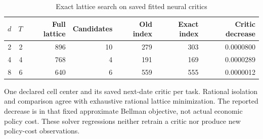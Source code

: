 \begin{table}[htbp]
\centering
\caption{Exact lattice search on saved fitted neural critics}\label{tab:algebraic56}
{\small\setlength{\tabcolsep}{4pt}
\begin{tabular}{rrrrrrr}
\toprule
$d$ & $T$ & Full lattice & Candidates & Old index & Exact index & Critic decrease \\
\midrule
2 & 2 & 896 & 10 & 279 & 303 & 0.0000800 \\
4 & 4 & 768 & 4 & 191 & 169 & 0.0000289 \\
8 & 6 & 640 & 6 & 559 & 555 & 0.0000012 \\
\bottomrule
\end{tabular}}
\par\smallskip
{\footnotesize One declared cell center and its saved next-date critic per task. Rational isolation and comparison agree with exhaustive rational lattice minimization. The reported decrease is in that fixed approximate Bellman objective, not actual economic policy cost. These solver regressions neither retrain a critic nor produce new policy-cost observations.}
\end{table}
